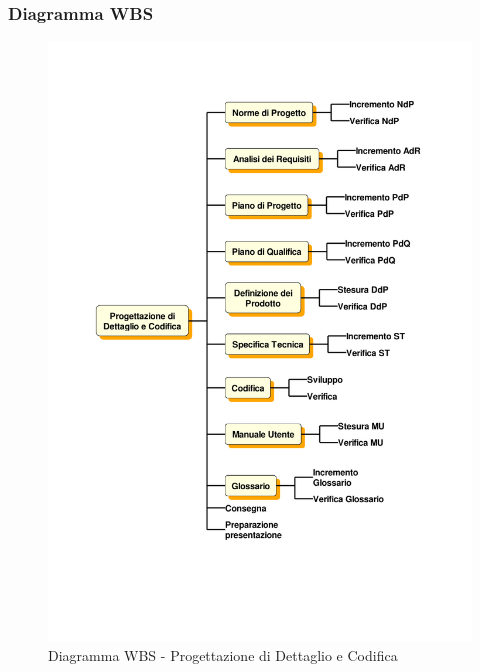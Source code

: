 \subsubsection{Diagramma WBS}
\begin{figure}[H]
	\centering
	\includegraphics[width= 15cm]{immagini/pdc_wbs.pdf}
	\caption{Diagramma WBS - Progettazione di Dettaglio e Codifica}
\end{figure}

